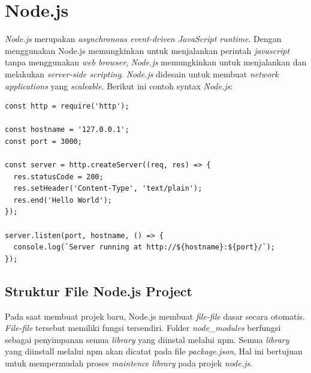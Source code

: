 













\section{Node.js}
\textit{Node.js} merupakan \textit{asynchronous event-driven JavaScript runtime}. Dengan menggunakan Node.js memungkinkan untuk menjalankan perintah \textit{javascript} tanpa menggunakan \textit{web browser}, \textit{Node.js} memungkinkan untuk menjalankan dan melakukan \textit{server-side scripting}\cite{Nodejs:01:about}. \textit{Node.js} didesain untuk membuat \textit{network applications} yang \textit{scaleable}. Berikut ini contoh syntax \textit{Node.js}:

\begin{lstlisting}
const http = require('http');

const hostname = '127.0.0.1';
const port = 3000;

const server = http.createServer((req, res) => {
  res.statusCode = 200;
  res.setHeader('Content-Type', 'text/plain');
  res.end('Hello World');
});

server.listen(port, hostname, () => {
  console.log(`Server running at http://${hostname}:${port}/`);
});
\end{lstlisting}


\subsection{Struktur File Node.js Project}
	Pada saat membuat projek baru, Node.js membuat \textit{file-file} dasar secara otomatis. \textit{File-file} tersebut memiliki fungsi tersendiri. Folder \textit{node\_modules} berfungsi sebagai penyimpanan semua \textit{library} yang diinstal melalui npm. Semua \textit{library} yang diinstall melalui npm akan dicatat pada file \textit{package.json}, Hal ini bertujuan untuk mempermudah proses \textit{maintence library} pada projek \textit{node.js}.
	
